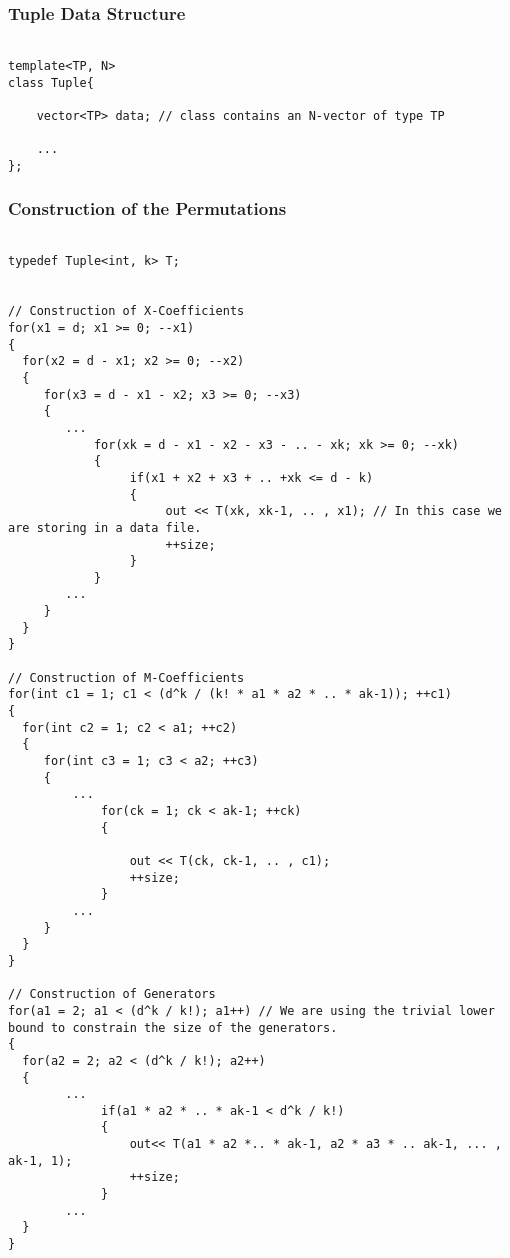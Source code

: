 \subsubsection*{Tuple Data Structure}

\begin{lstlisting}

template<TP, N>
class Tuple{

    vector<TP> data; // class contains an N-vector of type TP

    ...
};

\end{lstlisting}

\subsubsection*{Construction of the Permutations}

\begin{lstlisting}

typedef Tuple<int, k> T;


// Construction of X-Coefficients
for(x1 = d; x1 >= 0; --x1)
{
  for(x2 = d - x1; x2 >= 0; --x2)
  {
     for(x3 = d - x1 - x2; x3 >= 0; --x3) 
     {
        ...
            for(xk = d - x1 - x2 - x3 - .. - xk; xk >= 0; --xk)
            {
                 if(x1 + x2 + x3 + .. +xk <= d - k)
                 {
                      out << T(xk, xk-1, .. , x1); // In this case we are storing in a data file.
                      ++size;
                 }
            }
        ...
     }	
  }
}

// Construction of M-Coefficients
for(int c1 = 1; c1 < (d^k / (k! * a1 * a2 * .. * ak-1)); ++c1)
{
  for(int c2 = 1; c2 < a1; ++c2)
  {
     for(int c3 = 1; c3 < a2; ++c3)
     {
         ...
             for(ck = 1; ck < ak-1; ++ck)
             {

                 out << T(ck, ck-1, .. , c1);
                 ++size;
             }
         ...
     }
  }
}

// Construction of Generators
for(a1 = 2; a1 < (d^k / k!); a1++) // We are using the trivial lower bound to constrain the size of the generators.
{
  for(a2 = 2; a2 < (d^k / k!); a2++)
  {
        ...
             if(a1 * a2 * .. * ak-1 < d^k / k!)
             {
                 out<< T(a1 * a2 *.. * ak-1, a2 * a3 * .. ak-1, ... , ak-1, 1);
                 ++size;
             }
        ...
  }
}


\end{lstlisting}

